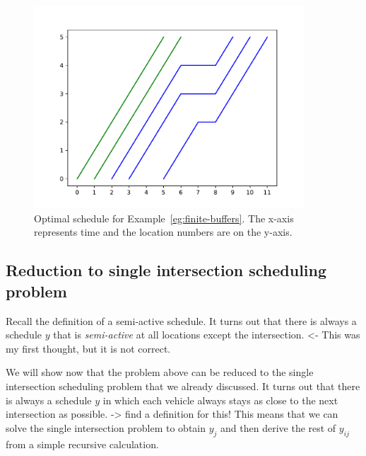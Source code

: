\documentclass{article}
\theoremstyle{definition}
\theoremstyle{plain}
\begin{document}
\begin{figure}
  \centering
  \includegraphics[width=0.9\textwidth]{figures/finite-buffer-schedule.pdf}
  \caption{Optimal schedule for Example~\ref{eg:finite-buffers}. The x-axis
    represents time and the location numbers are on the y-axis.}
  \label{fig:finite-buffer-example-schedule}
\end{figure}


\subsection{Reduction to single intersection scheduling problem}

{\color{gray} Recall the definition of a semi-active schedule. It turns out that
  there is always a schedule $y$ that is \textit{semi-active} at all locations
  except the intersection. <- This was my first thought, but it is not correct.}

We will show now that the problem above can be reduced to the single
intersection scheduling problem that we already discussed. It turns out that
there is always a schedule $y$ in which each vehicle always stays as close to
the next intersection as possible. -> find a definition for this! This means
that we can solve the single intersection problem to obtain $y_{j}$ and then
derive the rest of $y_{ij}$ from a simple recursive calculation.
\end{document}
